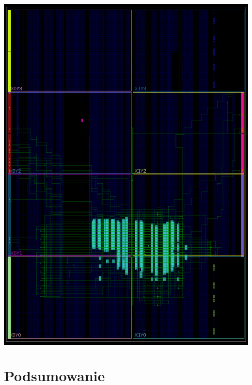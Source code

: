 \documentclass[11pt,a4paper]{article}
\begin{document}
			\begin{minipage}[c]{\textwidth}
	\begin{center}
	

					\includegraphics[height=0.9\textheight,width=\linewidth]{./rysunki/device_2.png}
	\end{center}	
	\end{minipage} 

\newpage

\section{Podsumowanie}
\end{document}
